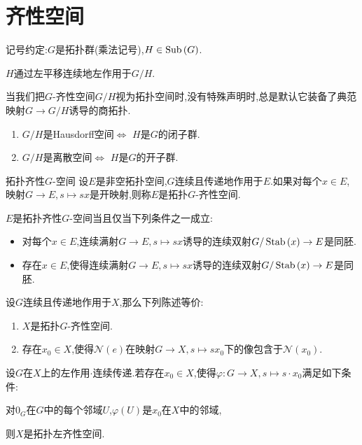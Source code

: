 \section{齐性空间}

记号约定:$G$是拓扑群(乘法记号),$H\in\operatorname{Sub}\left(G\right)$.

\begin{proposition}{}{}
	$H$通过左平移连续地左作用于$G/H$.
\end{proposition}

\begin{convention}{}{}
	当我们把$G$-齐性空间$G/H$视为拓扑空间时,没有特殊声明时,总是默认它装备了典范映射$G\to G/H$诱导的商拓扑.
\end{convention}

\begin{proposition}{}{}
	\begin{enumerate}
		\item $G/H$是Hausdorff空间$\iff$ $H$是$G$的闭子群.
		\item $G/H$是离散空间$\iff$ $H$是$G$的开子群.
	\end{enumerate}
\end{proposition}

\begin{definition}{拓扑齐性$G$-空间}{}
	设$E$是非空拓扑空间,$G$连续且传递地作用于$E$.如果对每个$x\in E$,映射$G\to E,s\mapsto sx$是开映射,则称$E$是拓扑$G$-齐性空间.
\end{definition}

\begin{remark}{}{}
	$E$是拓扑齐性$G$-空间当且仅当下列条件之一成立:
	\begin{itemize}
		\item 对每个$x\in E$,连续满射$G\to E,s\mapsto sx$诱导的连续双射$G/\operatorname{Stab}\left(x\right)\to E$是同胚.
		\item 存在$x\in E$,使得连续满射$G\to E,s\mapsto sx$诱导的连续双射$G/\operatorname{Stab}\left(x\right)\to E$是同胚.
	\end{itemize}
\end{remark}

\begin{proposition}{}{}
	设$G$连续且传递地作用于$X$,那么下列陈述等价:
	\begin{enumerate}
		\item $X$是拓扑$G$-齐性空间.
		\item 存在$x_{0}\in X$,使得$\mathcal{N}\left(e\right)$在映射$G\to X,s\mapsto sx_{0}$下的像包含于$\mathcal{N}\left(x_{0}\right)$.
	\end{enumerate}
\end{proposition}


\begin{proposition}{}{}
	设$G$在$X$上的左作用$\cdot$连续传递.若存在$x_{0}\in X$,使得$\varphi:G\to X,s\mapsto s\cdot x_{0}$满足如下条件:
	\begin{center}
		对$0_{G}$在$G$中的每个邻域$U$,$\varphi\left(U\right)$是$x_{0}$在$X$中的邻域,
	\end{center}
	则$X$是拓扑左齐性空间.
\end{proposition}
